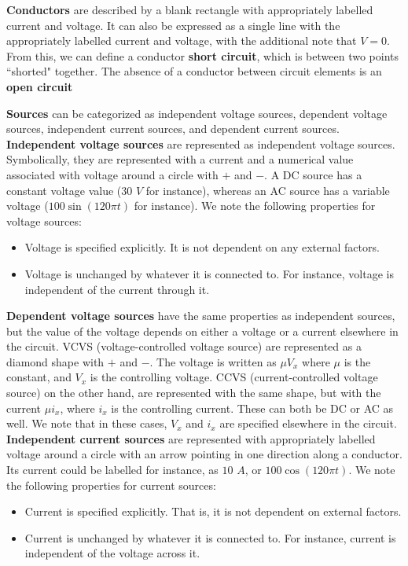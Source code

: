 \documentclass[11pt]{article}
\theoremstyle{plain} %
\theoremstyle{definition}
\theoremstyle{example}
\theoremstyle{remark}
\begin{document}
\textbf{Conductors} are described by a blank rectangle with appropriately labelled current and voltage. It can also be expressed as a single line with the appropriately labelled current and voltage, with the additional note that $V=0$. From this, we can define a conductor \textbf{short circuit}, which is between two points ``shorted" together. The absence of a conductor between circuit elements is an \textbf{open circuit}

\textbf{Sources} can be categorized as independent voltage sources, dependent voltage sources, independent current sources, and dependent current sources. \newline\textbf{Independent voltage sources} are represented as independent voltage sources. Symbolically, they are represented with a current and a numerical value associated with voltage around a circle with $+$ and $-$. A DC source has a constant voltage value ($30$ $V$ for instance), whereas an AC source has a variable voltage ($100 \sin(120\pi t)$ for instance). We note the following properties for voltage sources:
\begin{itemize}
	\item Voltage is specified explicitly. It is not dependent on any external factors. 
	\item Voltage is unchanged by whatever it is connected to. For instance, voltage is independent of the current through it. 
\end{itemize}
\textbf{Dependent voltage sources} have the same properties as independent sources, but the value of the voltage depends on either a voltage or a current elsewhere in the circuit. VCVS (voltage-controlled voltage source) are represented as a diamond shape with $+$ and $-$. The voltage is written as $\mu V_x$ where $\mu$ is the constant, and $V_x$ is the controlling voltage. CCVS (current-controlled voltage source) on the other hand, are represented with the same shape, but with the current $\mu i_x$, where $i_x$ is the controlling current. These can both be DC or AC as well. We note that in these cases, $V_x$ and $i_x$ are specified elsewhere in the circuit. 
\newline
\textbf{Independent current sources} are represented with appropriately labelled voltage around a circle with an arrow pointing in one direction along a conductor. Its current could be labelled for instance, as $10$ $A$, or $100 \cos(120\pi t)$. We note the following properties for current sources:
\begin{itemize}	
	\item Current is specified explicitly. That is, it is not dependent on external factors.
	\item Current is unchanged by whatever it is connected to. For instance, current is independent of the voltage across it. 
\end{itemize}
\end{document}
